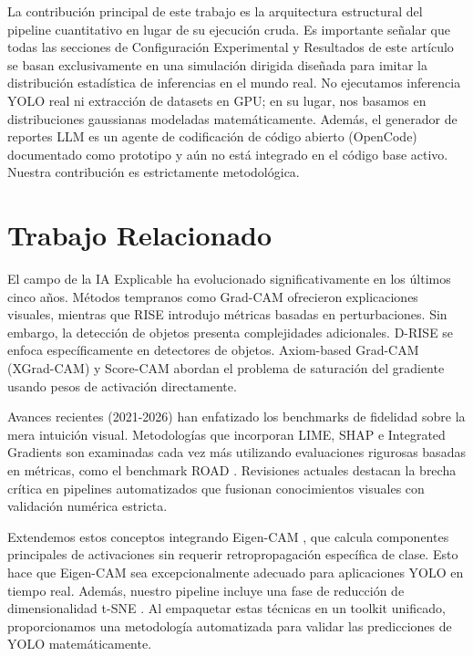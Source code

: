 \documentclass[conference]{IEEEtran}
\begin{document}
La contribución principal de este trabajo es la arquitectura estructural del pipeline cuantitativo en lugar de su ejecución cruda. Es importante señalar que todas las secciones de Configuración Experimental y Resultados de este artículo se basan exclusivamente en una simulación dirigida diseñada para imitar la distribución estadística de inferencias en el mundo real. No ejecutamos inferencia YOLO real ni extracción de datasets en GPU; en su lugar, nos basamos en distribuciones gaussianas modeladas matemáticamente. Además, el generador de reportes LLM es un agente de codificación de código abierto (OpenCode) documentado como prototipo y aún no está integrado en el código base activo. Nuestra contribución es estrictamente metodológica.

\section{Trabajo Relacionado}
El campo de la IA Explicable ha evolucionado significativamente en los últimos cinco años. Métodos tempranos como Grad-CAM \cite{selvaraju2017grad} ofrecieron explicaciones visuales, mientras que RISE \cite{petsiuk2018rise} introdujo métricas basadas en perturbaciones. Sin embargo, la detección de objetos presenta complejidades adicionales. D-RISE \cite{petsiuk2021drise} se enfoca específicamente en detectores de objetos. Axiom-based Grad-CAM (XGrad-CAM) \cite{fu2020xgrad} y Score-CAM \cite{wang2020score} abordan el problema de saturación del gradiente usando pesos de activación directamente.

Avances recientes (2021-2026) han enfatizado los benchmarks de fidelidad sobre la mera intuición visual. Metodologías que incorporan LIME, SHAP e Integrated Gradients son examinadas cada vez más utilizando evaluaciones rigurosas basadas en métricas, como el benchmark ROAD \cite{rong2022road}. Revisiones actuales \cite{arya2020aix360} destacan la brecha crítica en pipelines automatizados que fusionan conocimientos visuales con validación numérica estricta.

Extendemos estos conceptos integrando Eigen-CAM \cite{muhammad2020eigencam}, que calcula componentes principales de activaciones sin requerir retropropagación específica de clase. Esto hace que Eigen-CAM sea excepcionalmente adecuado para aplicaciones YOLO en tiempo real. Además, nuestro pipeline incluye una fase de reducción de dimensionalidad t-SNE \cite{vandermaaten2008tsne}. Al empaquetar estas técnicas en un toolkit unificado, proporcionamos una metodología automatizada para validar las predicciones de YOLO matemáticamente.
\end{document}
